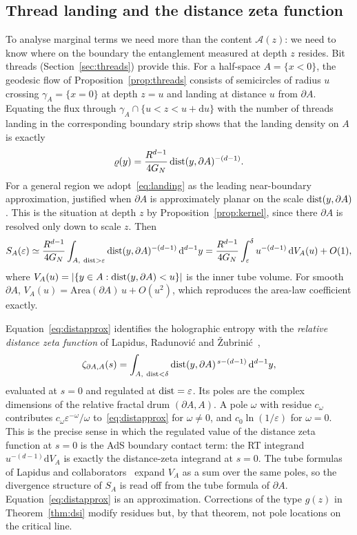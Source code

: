 \documentclass[11pt]{article}
\theoremstyle{definition}\newtheorem{definition}{Definition}[section]
\theoremstyle{remark}\newtheorem*{remark}{Remark}
\newcommand{\cA}{\mathcal{A}}
\newcommand{\dd}{\mathrm{d}}
\newcommand{\Area}{\mathrm{Area}}
\newcommand{\GN}{G_N}
\begin{document}
\subsection{Thread landing and the distance zeta function}
To analyse marginal terms we need more than the content $\cA(z)$: we need to know where on the boundary the
entanglement measured at depth $z$ resides. Bit threads (Section~\ref{sec:threads}) provide this. For a
half-space $A=\{x<0\}$, the geodesic flow of Proposition~\ref{prop:threads} consists of semicircles of radius
$u$ crossing $\gamma_A=\{x=0\}$ at depth $z=u$ and landing at distance $u$ from $\partial A$. Equating the flux
through $\gamma_A\cap\{u<z<u+\dd u\}$ with the number of threads landing in the corresponding boundary
strip shows that the landing density on $A$ is exactly
\begin{equation}
\varrho(y)=\frac{R^{d-1}}{4\GN}\,{\rm dist}(y,\partial A)^{-(d-1)} .
\label{eq:landing}
\end{equation}
For a general region we adopt~\eqref{eq:landing} as the leading near-boundary approximation, justified when
$\partial A$ is approximately planar on the scale ${\rm dist}(y,\partial A)$. This is the situation at depth
$z$ by Proposition~\ref{prop:kernel}, since there $\partial A$ is resolved only down to scale $z$. Then
\begin{equation}
S_A(\varepsilon)\simeq\frac{R^{d-1}}{4\GN}\int_{A,\ {\rm dist}>\varepsilon}{\rm dist}(y,\partial A)^{-(d-1)}\,\dd^{d-1}y
=\frac{R^{d-1}}{4\GN}\int_\varepsilon^{\delta}u^{-(d-1)}\,\dd V_A(u)+O(1),
\label{eq:distapprox}
\end{equation}
where $V_A(u)=|\{y\in A:{\rm dist}(y,\partial A)<u\}|$ is the inner tube volume. For smooth $\partial A$,
$V_A(u)=\Area(\partial A)\,u+O(u^2)$, which reproduces the area-law coefficient exactly.

Equation~\eqref{eq:distapprox} identifies the holographic entropy with the \emph{relative distance zeta
function} of Lapidus, Radunovi\'c and \v{Z}ubrini\'c~\cite{LRZ},
\begin{equation}
\zeta_{\partial A,A}(s)=\int_{A,\ {\rm dist}<\delta}{\rm dist}(y,\partial A)^{\,s-(d-1)}\,\dd^{d-1}y ,
\end{equation}
evaluated at $s=0$ and regulated at ${\rm dist}=\varepsilon$. Its poles are the complex dimensions of the
relative fractal drum $(\partial A,A)$. A pole $\omega$ with residue $c_\omega$ contributes
$c_\omega\varepsilon^{-\omega}/\omega$ to~\eqref{eq:distapprox} for $\omega\ne0$, and $c_0\ln(1/\varepsilon)$
for $\omega=0$. This is the precise sense in which the regulated value of the distance zeta function at $s=0$
is the AdS boundary contact term: the RT integrand $u^{-(d-1)}\dd V_A$ is exactly the distance-zeta
integrand at $s=0$. The tube formulas of Lapidus and collaborators~\cite{LvF,LRZ,LapidusPearse} expand $V_A$
as a sum over the same poles, so the divergence structure of $S_A$ is read off from the tube formula of
$\partial A$. Equation~\eqref{eq:distapprox} is an approximation. Corrections of the type $g(z)$ in
Theorem~\ref{thm:dsi} modify residues but, by that theorem, not pole locations on the critical line.
\end{document}
